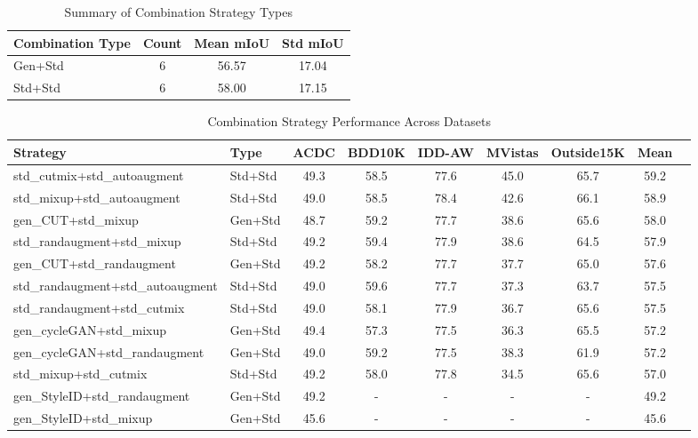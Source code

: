 
\begin{table}[htbp]
\centering
\caption{Summary of Combination Strategy Types}
\label{tab:combination_summary}
\begin{tabular}{lccc}
\toprule
Combination Type & Count & Mean mIoU & Std mIoU \\
\midrule
Gen+Std & 6 & 56.57 & 17.04 \\
Std+Std & 6 & 58.00 & 17.15 \\
\bottomrule
\end{tabular}
\end{table}

\begin{table}[htbp]
\centering
\caption{Combination Strategy Performance Across Datasets}
\label{tab:combination_results}
\begin{tabular}{llccccccc}
\toprule
Strategy & Type & ACDC & BDD10K & IDD-AW & MVistas & Outside15K & Mean \\
\midrule
std_cutmix+std_autoaugment & Std+Std & 49.3 & 58.5 & 77.6 & 45.0 & 65.7 & 59.2 \\
std_mixup+std_autoaugment & Std+Std & 49.0 & 58.5 & 78.4 & 42.6 & 66.1 & 58.9 \\
gen_CUT+std_mixup & Gen+Std & 48.7 & 59.2 & 77.7 & 38.6 & 65.6 & 58.0 \\
std_randaugment+std_mixup & Std+Std & 49.2 & 59.4 & 77.9 & 38.6 & 64.5 & 57.9 \\
gen_CUT+std_randaugment & Gen+Std & 49.2 & 58.2 & 77.7 & 37.7 & 65.0 & 57.6 \\
std_randaugment+std_autoaugment & Std+Std & 49.0 & 59.6 & 77.7 & 37.3 & 63.7 & 57.5 \\
std_randaugment+std_cutmix & Std+Std & 49.0 & 58.1 & 77.9 & 36.7 & 65.6 & 57.5 \\
gen_cycleGAN+std_mixup & Gen+Std & 49.4 & 57.3 & 77.5 & 36.3 & 65.5 & 57.2 \\
gen_cycleGAN+std_randaugment & Gen+Std & 49.0 & 59.2 & 77.5 & 38.3 & 61.9 & 57.2 \\
std_mixup+std_cutmix & Std+Std & 49.2 & 58.0 & 77.8 & 34.5 & 65.6 & 57.0 \\
gen_StyleID+std_randaugment & Gen+Std & 49.2 & - & - & - & - & 49.2 \\
gen_StyleID+std_mixup & Gen+Std & 45.6 & - & - & - & - & 45.6 \\
\bottomrule
\end{tabular}
\end{table}

